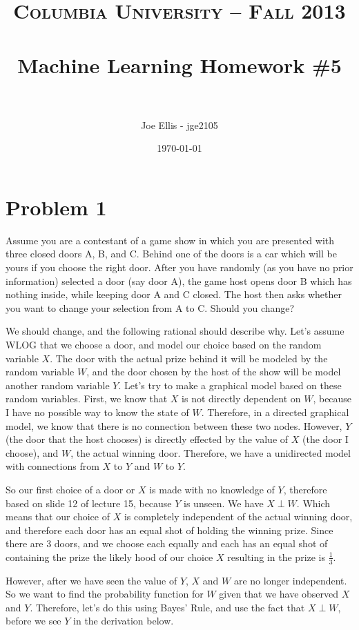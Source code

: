 \documentclass[paper=a4, fontsize=11pt]{scrartcl} %
\title{	
\normalfont \normalsize 
\textsc{Columbia University -- Fall 2013} \\ [25pt] %
\horrule{0.5pt} \\[0.4cm] %
\huge Machine Learning Homework \#5\\ %
\horrule{2pt} \\[0.5cm] %
}
\author{Joe Ellis - jge2105} %
\date{\normalsize\today} %
\begin{document}
\maketitle %


\section{Problem 1}
Assume you are a contestant of a game show in which you are presented with three closed doors A, B, and C. 
Behind one of the doors is a car which will be yours if you choose the right door. 
After you have randomly (as you have no prior information) selected a door (say door A), the game host opens door B which has nothing inside, while keeping door A and C closed. 
The host then asks whether you want to change your selection from A to C. 
Should you change?

We should change, and the following rational should describe why.
Let's assume WLOG that we choose a door, and model our choice based on the random variable $X$.  
The door with the actual prize behind it will be modeled by the random variable $W$, and the door chosen by the host of the show will be model another random variable $Y$.
Let's try to make a graphical model based on these random variables.  
First, we know that $X$ is not directly dependent on $W$, because I have no possible way to know the state of $W$.
Therefore, in a directed graphical model, we know that there is no connection between these two nodes.
However, $Y$ (the door that the host chooses) is directly effected by the value of $X$ (the door I choose), and $W$, the actual winning door. 
Therefore, we have a unidirected model with connections from $X$ to $Y$ and $W$ to $Y$.

So our first choice of a door or $X$ is made with no knowledge of $Y$, therefore based on slide 12 of lecture 15, because $Y$ is unseen. 
We have $X \perp W$.
Which means that our choice of $X$ is completely independent of the actual winning door, and therefore each door has an equal shot of holding the winning prize.  
Since there are 3 doors, and we choose each equally and each has an equal shot of containing the prize the likely hood of our choice $X$ resulting in the prize is $\frac{1}{3}$.

However, after we have seen the value of $Y$, $X$ and $W$ are no longer independent.
So we want to find the probability function for $W$ given that we have observed $X$ and $Y$.
Therefore, let's do this using Bayes' Rule, and use the fact that $X \perp W$, before we see $Y$ in the derivation below.
\end{document}
